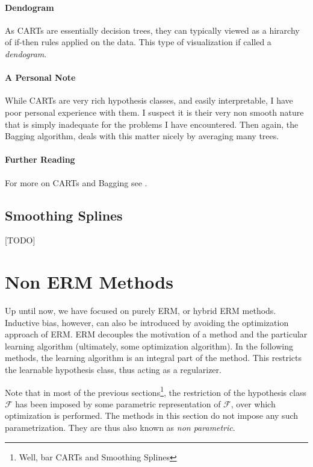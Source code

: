 \documentclass[12pt,a4paper]{article}
\theoremstyle{plain}
\theoremstyle{definition}
\newcommand{\hypclass}{\mathcal{F}}
\begin{document}
\paragraph{Dendogram}
As CARTs are essentially decision trees, they can typically viewed as a hirarchy of if-then rules applied on the data.
This type of visualization if called a \emph{dendogram}.

\paragraph{A Personal Note}
While CARTs are very rich hypothesis classes, and easily interpretable, I have poor personal experience with them. 
I suspect it is their very non smooth nature that is simply inadequate for the problems I have encountered.
Then again, the Bagging algorithm, deals with this matter nicely by averaging many trees.


\paragraph{Further Reading}
For more on CARTs and Bagging see \citep[Section 9]{hastie_elements_2003}.


\subsection{Smoothing Splines}
[TODO]





\section{Non ERM Methods}
\label{sec:non_erm}
Up until now, we have focused on purely ERM, or hybrid ERM methods.
Inductive bias, however, can also be introduced by avoiding the optimization approach of ERM.
ERM decouples the motivation of a method and the particular learning algorithm (ultimately, some optimization algorithm).
In the following methods, the learning algorithm is an integral part of the method. 
This restricts the learnable hypothesis class, thus acting as a regularizer.

Note that in most of the previous sections\footnote{Well, bar CARTs and Smoothing Splines}, the restriction of the hypothesis class $\hypclass$ has been imposed by some parametric representation of $\hypclass$, over which optimization is performed.
The methods in this section do not impose any such parametrization. They are thus also known as \emph{non parametric}.
\end{document}

